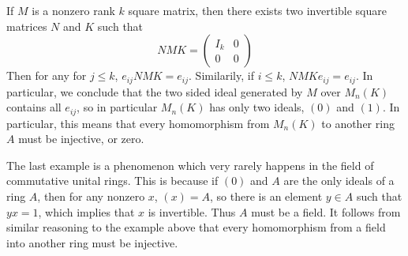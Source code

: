 \begin{example}
    If $M$ is a nonzero rank $k$ square matrix, then there exists two invertible square matrices $N$ and $K$ such that
    \[  NMK = \begin{pmatrix} I_k & 0 \\ 0 & 0 \end{pmatrix} \]
    Then for any for $j \leq k$, $e_{ij} NMK = e_{ij}$. Similarily, if $i \leq k$, $NMKe_{ij} = e_{ij}$. In particular, we conclude that the two sided ideal generated by $M$ over $M_n(K)$ contains all $e_{ij}$, so in particular $M_n(K)$ has only two ideals, $(0)$ and $(1)$. In particular, this means that every homomorphism from $M_n(K)$ to another ring $A$ must be injective, or zero.
\end{example}

\begin{example}
The last example is a phenomenon which very rarely happens in the field of commutative unital rings. This is because if $(0)$ and $A$ are the only ideals of a ring $A$, then for any nonzero $x$, $(x) = A$, so there is an element $y \in A$ such that $yx = 1$, which implies that $x$ is invertible. Thus $A$ must be a field. It follows from similar reasoning to the example above that every homomorphism from a field into another ring must be injective.
\end{example}

